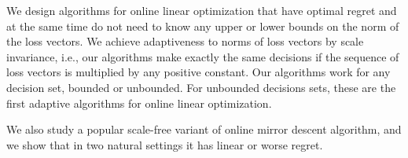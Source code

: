 We design algorithms for online linear optimization that have optimal regret
and at the same time do not need to know any upper or lower bounds on the norm
of the loss vectors.  We achieve adaptiveness to norms of loss vectors by scale
invariance, i.e., our algorithms make exactly the same decisions if the
sequence of loss vectors is multiplied by any positive constant.  Our
algorithms work for any decision set, bounded or unbounded.  For unbounded
decisions sets, these are the first adaptive algorithms for online linear
optimization.

We also study a popular scale-free variant of online mirror descent algorithm,
and we show that in two natural settings it has linear or worse regret.
